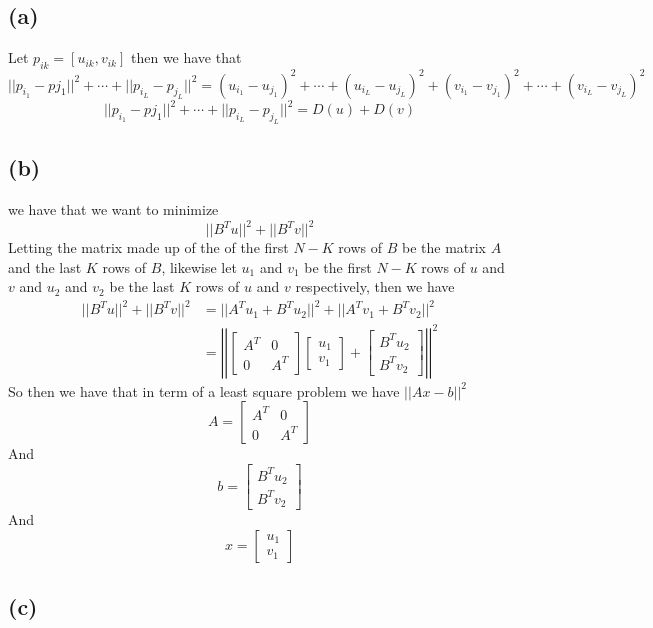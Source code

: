 \subsection*{(a)}
Let $p_{ik}=[u_{ik},v_{ik}]$ then we have that 
$$||p_{i_{1}}-p{j_{1}}||^2+\cdots+||p_{i_{L}}-p_{j_{L}}||^2=(u_{i_{1}}-u_{j_{1}})^2+\cdots+(u_{i_{L}}-u_{j_{L}})^2+(v_{i_{1}}-v_{j_{1}})^2+\cdots+(v_{i_{L}}-v_{j_{L}})^2$$
$$||p_{i_{1}}-p{j_{1}}||^2+\cdots+||p_{i_{L}}-p_{j_{L}}||^2=D(u)+D(v)$$
\subsection*{(b)}
we have that we want to minimize
$$||B^Tu||^2+||B^Tv||^2$$
Letting the matrix made up of the of the first $N-K$ rows of $B$
be the matrix $A$ and the last $K$ rows of $B$, likewise let
$u_{1}$ and $v_{1}$ be the first $N-K$ rows of $u$ and $v$ and
$u_{2}$ and $v_{2}$ be the last $K$ rows of $u$ and $v$ respectively, then we have
\begin{align*}
||B^Tu||^2+||B^Tv||^2&=||A^Tu_{1}+B^Tu_{2}||^2+||A^Tv_{1}+B^Tv_{2}||^2\\
&=\left|\left|\begin{bmatrix}
    A^T & 0\\
    0 & A^T
\end{bmatrix}\begin{bmatrix}
    u_{1}\\
    v_{1}
\end{bmatrix}+\begin{bmatrix}
    B^Tu_{2}\\
    B^Tv_{2}
\end{bmatrix}\right|\right|^2
\end{align*}
So then we have that in term of a least square problem we have
$||Ax-b||^2$
$$A=\begin{bmatrix}
    A^T & 0\\
    0 & A^T
\end{bmatrix}$$
And
$$b=\begin{bmatrix}
    B^Tu_{2}\\
    B^Tv_{2}
\end{bmatrix}$$
And
$$x=\begin{bmatrix}
    u_{1}\\
    v_{1}
\end{bmatrix}$$
\subsection*{(c)}

